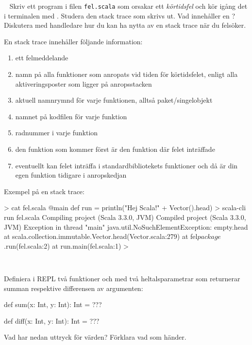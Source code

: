 \QUESTEND




\QUESTBEGIN

\Task  \what~  Skriv ett program i filen \texttt{fel.scala} som orsakar ett \emph{körtidsfel} och kör igång det i terminalen med . Studera den stack trace som skrivs ut. Vad innehåller en ? Diskutera med handledare hur du kan ha nytta av en stack trace när du felsöker.

\SOLUTION

\TaskSolved \what En stack trace innehåller följande information:
\begin{enumerate}
  \item ett felmeddelande
  \item namn på alla funktioner som anropats vid tiden för körtidsfelet, enligt alla aktiveringsposter som ligger på anropsstacken 
  \item aktuell namnrymnd för varje funktionen, alltså paket/singelobjekt
  \item namnet på kodfilen för varje funktion
  \item radnummer i varje funktion 
  \item den funktion som kommer först är den funktion där felet inträffade
  \item eventuellt kan felet inträffa i standardbibliotekets funktioner och då är din egen funktion tidigare i anropskedjan
\end{enumerate}

Exempel på en stack trace:
\begin{REPLnonum}
> cat fel.scala 
@main def run = 
  println("Hej Scala!" + Vector().head)
> scala-cli run fel.scala
Compiling project (Scala 3.3.0, JVM)
Compiled project (Scala 3.3.0, JVM)
Exception in thread "main" java.util.NoSuchElementException: empty.head
	at scala.collection.immutable.Vector.head(Vector.scala:279)
	at fel$package$.run(fel.scala:2)
	at run.main(fel.scala:1)
>
\end{REPLnonum}

\QUESTEND


\ExtraTasks %




\QUESTBEGIN

\Task  \what~  

\Subtask Definiera i REPL två funktioner  och  med två heltalsparametrar som returnerar summan respektive differensen av argumenten:
\begin{Code}
def sum(x: Int, y: Int): Int = ???

def diff(x: Int, y: Int): Int = ???
\end{Code}
Vad har nedan uttryck för värden? Förklara vad som händer.

